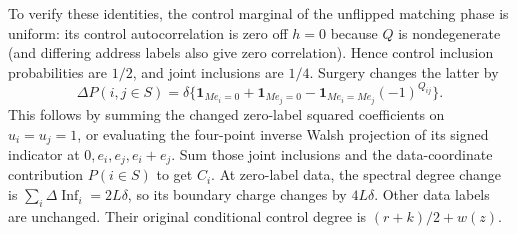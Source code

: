 \documentclass[11pt]{article}
\begin{document}
To verify these identities, the control marginal of the unflipped
matching phase is uniform: its control autocorrelation is zero off
$h=0$ because $Q$ is nondegenerate (and differing address labels
also give zero correlation). Hence control inclusion probabilities
are $1/2$, and joint inclusions are $1/4$. Surgery changes the latter by
\[
 \Delta P(i,j\in S)=\delta\{\mathbf1_{Me_i=0}
 +\mathbf1_{Me_j=0}
 -\mathbf1_{Me_i=Me_j}(-1)^{Q_{ij}}\}.
\]
This follows by summing the changed zero-label squared coefficients
on $u_i=u_j=1$, or evaluating the four-point inverse Walsh projection
of its signed indicator at $0,e_i,e_j,e_i+e_j$. Sum those joint
inclusions and the data-coordinate contribution $P(i\in S)$ to get
$C_i$. At zero-label data, the spectral degree change is
$\sum_i\Delta\operatorname{Inf}_i=2L\delta$, so its boundary charge
changes by $4L\delta$. Other data labels are unchanged. Their original
conditional control degree is $(r+k)/2+w(z)$.
\end{document}
